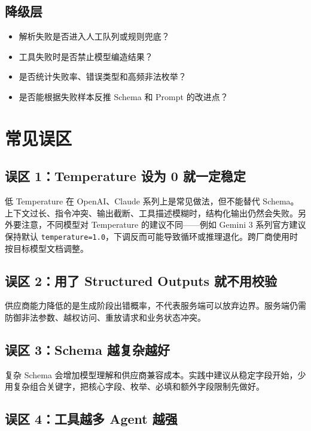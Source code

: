 \documentclass[9pt,a4paper,twocolumn]{ctexart}
\begin{document}
\subsection*{降级层}

\begin{itemize}[itemsep=1pt, topsep=2pt]
  \item 解析失败是否进入人工队列或规则兜底？
  \item 工具失败时是否禁止模型编造结果？
  \item 是否统计失败率、错误类型和高频非法枚举？
  \item 是否能根据失败样本反推 Schema 和 Prompt 的改进点？
\end{itemize}


\section*{常见误区}


\subsection*{误区 1：Temperature 设为 0 就一定稳定}


低 Temperature 在 OpenAI、Claude 系列上是常见做法，但不能替代 Schema。上下文过长、指令冲突、输出截断、工具描述模糊时，结构化输出仍然会失败。另外要注意，不同模型对 Temperature 的建议不同——例如 Gemini 3 系列官方建议保持默认 \texttt{temperature=1.0}，下调反而可能导致循环或推理退化。跨厂商使用时按目标模型文档调整。



\subsection*{误区 2：用了 Structured Outputs 就不用校验}


供应商能力降低的是生成阶段出错概率，不代表服务端可以放弃边界。服务端仍需防御非法参数、越权访问、重放请求和业务状态冲突。



\subsection*{误区 3：Schema 越复杂越好}


复杂 Schema 会增加模型理解和供应商兼容成本。实践中建议从稳定字段开始，少用复杂组合关键字，把核心字段、枚举、必填和额外字段限制先做好。



\subsection*{误区 4：工具越多 Agent 越强}
\end{document}
